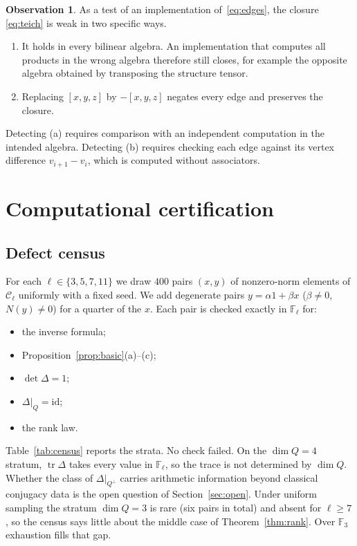 \documentclass[11pt]{amsart}
\theoremstyle{definition}
\newtheorem{observation}[theorem]{Observation}
\theoremstyle{remark}
\newcommand{\F}{\mathbb{F}}
\newcommand{\C}{\mathcal{C}}
\newcommand{\assoc}[3]{[#1,#2,#3]}
\DeclareMathOperator{\tr}{tr}
\begin{document}
\begin{observation}\label{obs:weak}
As a test of an implementation of~\eqref{eq:edges}, the closure
\eqref{eq:teich} is weak in two specific ways.
\begin{enumerate}[label=\textup{(\alph*)}]
\item It holds in every bilinear algebra. An implementation that computes all
  products in the wrong algebra therefore still closes, for example the
  opposite algebra obtained by transposing the structure tensor.
\item Replacing $\assoc xyz$ by $-\assoc xyz$ negates every edge and preserves
  the closure.
\end{enumerate}
Detecting (a) requires comparison with an independent computation in the
intended algebra. Detecting (b) requires checking each edge against its
vertex difference $v_{i+1}-v_i$, which is computed without associators.
\end{observation}

\section{Computational certification}\label{sec:census}

\subsection{Defect census}
For each $\ell\in\{3,5,7,11\}$ we draw $400$ pairs $(x,y)$ of nonzero-norm
elements of $\C_\ell$ uniformly with a fixed seed. We add degenerate pairs
$y=\alpha1+\beta x$ ($\beta\neq0$, $N(y)\neq0$) for a quarter of the $x$.
Each pair is checked exactly in $\F_\ell$ for:
\begin{itemize}
\item the inverse formula;
\item Proposition~\ref{prop:basic}(a)--(c);
\item $\det\Delta=1$;
\item $\Delta|_Q=\mathrm{id}$;
\item the rank law.
\end{itemize}
Table~\ref{tab:census} reports the strata. No check failed. On the
$\dim Q=4$ stratum, $\tr\Delta$ takes every value in $\F_\ell$, so the trace is
not determined by $\dim Q$. Whether the class of $\Delta|_{Q^\perp}$ carries
arithmetic information beyond classical conjugacy data is the open question of
Section~\ref{sec:open}. Under uniform sampling the stratum $\dim Q=3$ is rare
(six pairs in total) and absent for $\ell\ge7$, so the census says little about
the middle case of Theorem~\ref{thm:rank}. Over $\F_3$ exhaustion fills that
gap.
\end{document}

